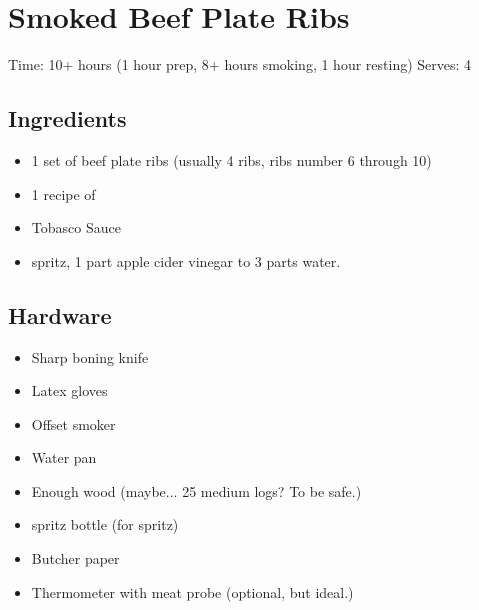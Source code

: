 \section{Smoked Beef Plate Ribs}
\label{smokedBeefPlateRibs}
\setcounter{secnumdepth}{0}
Time: 10+ hours (1 hour prep, 8+ hours smoking, 1 hour resting)
Serves: 4

\begin{multicols}{2}
\subsection*{Ingredients}
\begin{itemize}
    \item 1 set of beef plate ribs (usually 4 ribs, ribs number 6 through 10)
    \item 1 recipe of 
    \item Tobasco Sauce
    \item spritz, 1 part apple cider vinegar to 3 parts water.
\end{itemize}

\subsection*{Hardware}
\begin{itemize}
    \item Sharp boning knife
    \item Latex gloves
    \item Offset smoker
    \item Water pan
    \item Enough wood (maybe... 25 medium logs? To be safe.)
    \item spritz bottle (for spritz)
    \item Butcher paper
    \item Thermometer with meat probe (optional, but ideal.)
\end{itemize}
\clearpage


\end{multicols}
